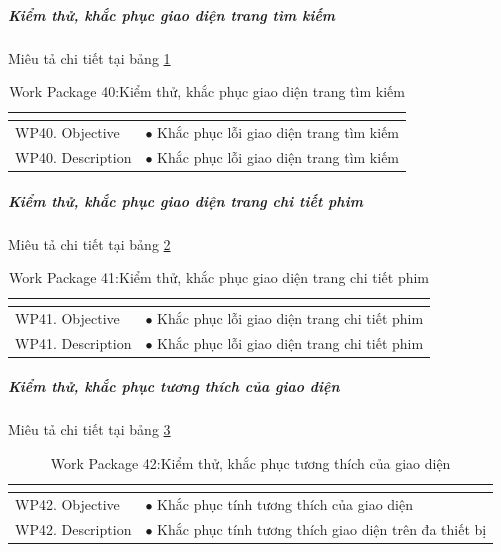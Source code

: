 \documentclass[a4paper]{book}
\begin{document}
\subparagraph{Kiểm thử, khắc phục giao diện trang tìm kiếm} Miêu tả chi tiết tại bảng \ref{table:kt_kp_giaodien_timkiem}
\begin{table}[h!]
	\begin{center}
		\begin{tabular}{|p{4cm}|p{10cm}|}
			\hline
			\multicolumn{2}{|c|}{\cellcolor[HTML]{363636}{\color[HTML]{FFFFFF}Work package 40: Kiểm thử, khắc phục giao diện trang tìm kiếm}}\\
			\hline
			\multirow{1}{*}{WP40. Objective} & $\bullet$ Khắc phục lỗi giao diện trang tìm kiếm\\
			\hline
			\multirow{1}{*}{WP40. Description} & $\bullet$ Khắc phục lỗi giao diện trang tìm kiếm \\
			\hline
		\end{tabular}
		\caption{Work Package 40:Kiểm thử, khắc phục giao diện trang tìm kiếm}
		\label{table:kt_kp_giaodien_timkiem}
	\end{center}
\end{table}
\subparagraph{Kiểm thử, khắc phục giao diện trang chi tiết phim} Miêu tả chi tiết tại bảng \ref{table:kt_kp_giaodien_chitietxemphim}
\begin{table}[h!]
	\begin{center}
		\begin{tabular}{|p{4cm}|p{10cm}|}
			\hline
			\multicolumn{2}{|c|}{\cellcolor[HTML]{363636}{\color[HTML]{FFFFFF}Work package 41: Kiểm thử, khắc phục giao diện trang chi tiết phim}}\\
			\hline
			\multirow{1}{*}{WP41. Objective} & $\bullet$ Khắc phục lỗi giao diện trang chi tiết phim\\
			\hline
			\multirow{1}{*}{WP41. Description} & $\bullet$ Khắc phục lỗi giao diện trang chi tiết phim \\
			\hline
		\end{tabular}
		\caption{Work Package 41:Kiểm thử, khắc phục giao diện trang chi tiết phim}
		\label{table:kt_kp_giaodien_chitietxemphim}
	\end{center}
\end{table}
\subparagraph{Kiểm thử, khắc phục tương thích của giao diện}
Miêu tả chi tiết tại bảng \ref{table:kt_kp_tuongthich_giaodien}
\begin{table}[h!]
	\begin{center}
		\begin{tabular}{|p{4cm}|p{10cm}|}
			\hline
			\multicolumn{2}{|c|}{\cellcolor[HTML]{363636}{\color[HTML]{FFFFFF}Work package 42: Kiểm thử, khắc phục tương thích của giao diện}}\\
			\hline
			\multirow{1}{*}{WP42. Objective} & $\bullet$ Khắc phục tính tương thích của giao diện\\
			\hline
			\multirow{1}{*}{WP42. Description} & $\bullet$ Khắc phục tính tương thích giao diện trên đa thiết bị \\
			\hline
		\end{tabular}
		\caption{Work Package 42:Kiểm thử, khắc phục tương thích của giao diện}
		\label{table:kt_kp_tuongthich_giaodien}
	\end{center}
\end{table}
\end{document}
